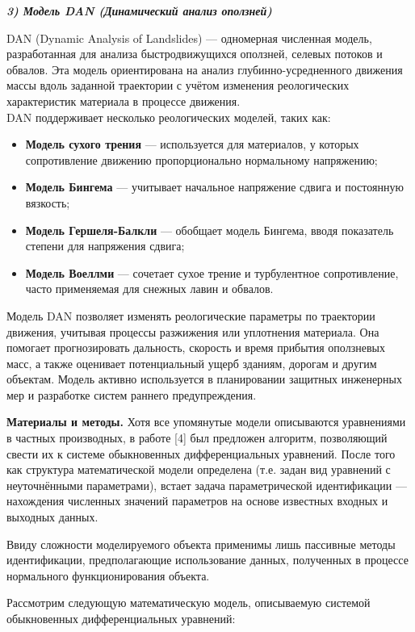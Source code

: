 \emph{{\bfseries 3) Модель DAN (Динамический анализ оползней)}}

DAN (Dynamic Analysis of Landslides) --- одномерная численная модель,
разработанная для анализа быстродвижущихся оползней, селевых потоков и
обвалов. Эта модель ориентирована на анализ глубинно-усредненного
движения массы вдоль заданной траектории с учётом изменения
реологических характеристик материала в процессе движения.\\
DAN поддерживает несколько реологических моделей, таких как:

\begin{itemize}
\item
  {\bfseries Модель сухого трения} --- используется для материалов, у
  которых сопротивление движению пропорционально нормальному напряжению;
\item
  {\bfseries Модель Бингема} --- учитывает начальное напряжение сдвига и
  постоянную вязкость;
\item
  {\bfseries Модель Гершеля-Балкли} --- обобщает модель Бингема, вводя
  показатель степени для напряжения сдвига;
\item
  {\bfseries Модель Воеллми} --- сочетает сухое трение и турбулентное
  сопротивление, часто применяемая для снежных лавин и обвалов.
\end{itemize}

Модель DAN позволяет изменять реологические параметры по траектории
движения, учитывая процессы разжижения или уплотнения материала. Она
помогает прогнозировать дальность, скорость и время прибытия оползневых
масс, а также оценивает потенциальный ущерб зданиям, дорогам и другим
объектам. Модель активно используется в планировании защитных инженерных
мер и разработке систем раннего предупреждения.

{\bfseries Материалы и методы.} Хотя все упомянутые модели описываются
уравнениями в частных производных, в работе {[}4{]} был предложен
алгоритм, позволяющий свести их к системе обыкновенных дифференциальных
уравнений. После того как структура математической модели определена
(т.е. задан вид уравнений с неуточнёнными параметрами), встает задача
параметрической идентификации --- нахождения численных значений
параметров на основе известных входных и выходных данных.

Ввиду сложности моделируемого объекта применимы лишь пассивные методы
идентификации, предполагающие использование данных, полученных в
процессе нормального функционирования объекта.

Рассмотрим следующую математическую модель, описываемую системой
обыкновенных дифференциальных уравнений:

